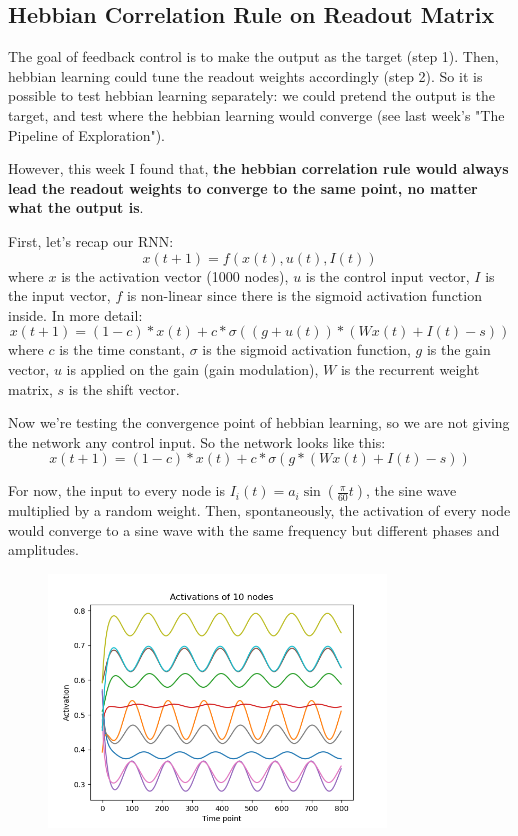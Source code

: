 \documentclass[12pt, a4paper]{article}
\begin{document}
\newpage

\subsection*{Hebbian Correlation Rule on Readout Matrix}

The goal of feedback control is to make the output as the target (step 1). Then, hebbian learning could tune the readout weights accordingly (step 2). So it is possible to test hebbian learning separately: we could pretend the output is the target, and test where the hebbian learning would converge (see last week's "The Pipeline of Exploration").

However, this week I found that, \textbf{the hebbian correlation rule would always lead the readout weights to converge to the same point, no matter what the output is}.

First, let's recap our RNN:
$$x(t+1) = f(x(t), u(t), I(t))$$
where $x$ is the activation vector (1000 nodes), $u$ is the control input vector, $I$ is the input vector, $f$ is non-linear since there is the sigmoid activation function inside. In more detail:
$$x(t+1) = (1-c)*x(t) + c*\sigma((g+u(t)) * (Wx(t) + I(t) - s))$$
where $c$ is the time constant, $\sigma$ is the sigmoid activation function, $g$ is the gain vector, $u$ is applied on the gain (gain modulation), $W$ is the recurrent weight matrix, $s$ is the shift vector.

Now we're testing the convergence point of hebbian learning, so we are not giving the network any control input. So the network looks like this:
$$x(t+1) = (1-c)*x(t) + c*\sigma(g * (Wx(t) + I(t) - s))$$

For now, the input to every node is $I_i(t) = a_i \sin(\frac{\pi}{60}t)$, the sine wave multiplied by a random weight. Then, spontaneously, the activation of every node would converge to a sine wave with the same frequency but different phases and amplitudes.

\begin{figure}[H]
    \centering
    \includegraphics[width=0.8\textwidth]{RNN/FORCE/fig/FORCE_ff_activations.png}
\end{figure}
\end{document}
